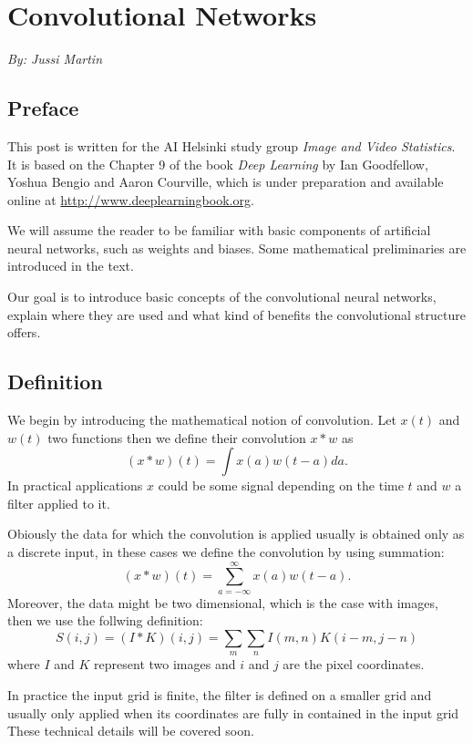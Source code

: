 \documentclass[]{article}
\begin{document}
\section{Convolutional Networks}
\begin{center}
  \emph{By: Jussi Martin}
\end{center}
\subsection{Preface}
This post is written for the AI Helsinki study group \emph{Image and Video Statistics}.
It is based on the Chapter 9 of the book \emph{Deep Learning} by Ian Goodfellow,
Yoshua Bengio and Aaron Courville, which is under preparation and available
online at \url{http://www.deeplearningbook.org}.

We will assume the reader to be familiar with basic components of artificial
neural networks, such as weights and biases. Some mathematical preliminaries are
introduced in the text.

Our goal is to introduce basic concepts of the convolutional neural networks,
explain where they are used and what kind of benefits the convolutional
structure offers.


\subsection{Definition}
We begin by introducing the mathematical notion of convolution. Let $x(t)$ and $w(t)$
two functions then we define their convolution $x * w$ as
\[
(x * w)(t) = \int x(a)w(t - a)da.
\]
In practical applications $x$ could be some signal depending on the time $t$ and
$w$ a filter applied to it.

Obiously the data for which the convolution is applied usually is obtained only
as a discrete input, in these cases we define the convolution by using
summation:
\[
(x * w)(t) = \sum_{a = -\infty}^{\infty} x(a)w(t - a).
\]
Moreover, the data might be two dimensional, which is the case with images, then
we use the follwing definition:
\[
S(i, j) = (I * K)(i, j) = \sum_m \sum_n I(m , n) K(i - m, j - n)
\]
where $I$ and $K$ represent two images and $i$ and $j$ are the pixel coordinates.

In practice the input grid is finite, the filter is defined on a smaller grid and
usually only applied when its coordinates are fully in contained in the input grid
These technical details will be covered soon. 
\end{document}
